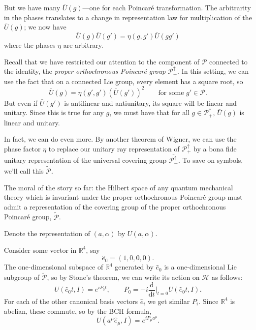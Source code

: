 \documentclass[a4paper,10pt]{scrreprt}
\newcommand{\tder}[2]{\frac{\text{d} #1}{\text{d} #2}}
\newcommand{\R}{\mathbb{R}}
\theoremstyle{definition}
\theoremstyle{plain}
\theoremstyle{remark}
\begin{document}
But we have many $\bar{U}(g)$---one for each Poincar{\'e} transformation. The arbitrarity in the phases translates to a change in representation law for multiplication of the $\bar{U}(g)$; we now have 
\begin{equation*}
  \bar{U}(g) \bar{U}(g') = \eta(g, g')\bar{U}(gg')
\end{equation*}
where the phases $\eta$ are arbitrary.

Recall that we have restricted our attention to the component of $\mathcal{P}$ connected to the identity, the \emph{proper orthochronous Poincar{\'e} group} $\mathcal{P}_{+}^{\uparrow}$. In this setting, we can use the fact that on a connected Lie group, every element has a square root, so
\begin{equation*}
  \bar{U}(g) = \eta(g',g')(\bar{U}(g'))^{2}\qquad\text{for some }g' \in \mathcal{P}.
\end{equation*}
But even if $\bar{U}(g')$ is antilinear and antiunitary, its square will be linear and unitary. Since this is true for any $g$, we must have that for all $g \in \mathcal{P}_{+}^{\uparrow}$, $\bar{U}(g)$ is linear and unitary.

In fact, we can do even more. By another theorem of Wigner, we can use the phase factor $\eta$ to replace our unitary ray representation of $\mathcal{P}_{+}^{\uparrow}$ by a bona fide unitary representation of the universal covering group $\overline{\mathcal{P}_{+}^{\uparrow}}$. To save on symbols, we'll call this $\widetilde{\mathcal{P}}$.

The moral of the story so far: the Hilbert space of any quantum mechanical theory which is invariant under the proper orthochronous Poincar{\'e} group must admit a representation of the covering group of the proper orthochronous Poincar{\'e} group, $\widetilde{\mathcal{P}}$.

Denote the representation of $(a, \alpha)$ by $U(a, \alpha)$.

Consider some vector in $\R^{4}$, say
\begin{equation*}
  \hat{e}_{0} = (1,0,0,0).
\end{equation*}
The one-dimensional subspace of $\R^{4}$ generated by $\hat{e}_{0}$ is a one-dimensional Lie subgroup of $\widetilde{\mathcal{P}}$, so by Stone's theorem, we can write its action on $\mathscr{H}$ as follows:
\begin{equation*}
  U(\hat{e}_{0} t, I) = e^{i P_{0} t},\qquad P_{0} = -i \tder{}{t}\bigg|_{t=0} U(\hat{e}_{0} t, I).
\end{equation*}
For each of the other canonical basis vectors $\hat{e}_{i}$ we get similar $P_{i}$. Since $\R^4$ is abelian, these commute, so by the BCH formula,
\begin{equation*}
  U(a^{\mu} \hat{e}_{\mu}, I) = e^{i P_{\mu} a^{\mu}}.
\end{equation*}
\end{document}
